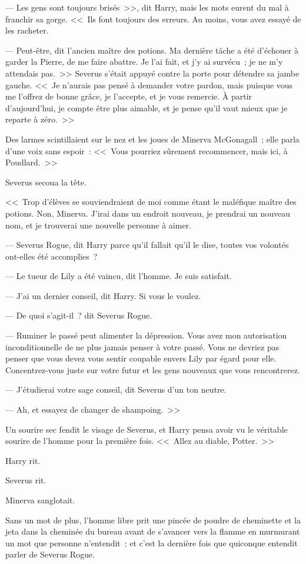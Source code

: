 --- Les gens sont toujours brisés~>>, dit Harry, mais les mots eurent du mal à franchir sa gorge. <<~Ils font toujours des erreurs. Au moins, vous avez essayé de les racheter.

--- Peut-être, dit l'ancien maître des potions. Ma dernière tâche a été d'échouer à garder la Pierre, de me faire abattre. Je l'ai fait, et j'y ai survécu~; je ne m'y attendais pas.~>> Severus s'était appuyé contre la porte pour détendre sa jambe gauche. <<~Je n'aurais pas pensé à demander votre pardon, mais puisque vous me l'offrez de bonne grâce, je l'accepte, et je vous remercie. À partir d'aujourd'hui, je compte être plus aimable, et je pense qu'il vaut mieux que je reparte à zéro.~>>

Des larmes scintillaient sur le nez et les joues de Minerva McGonagall~; elle parla d'une voix sans espoir~: <<~Vous pourriez sûrement recommencer, mais ici, à Poudlard.~>>

Severus secoua la tête.

<<~Trop d'élèves se souviendraient de moi comme étant le maléfique maître des potions. Non, Minerva. J'irai dans un endroit nouveau, je prendrai un nouveau nom, et je trouverai une nouvelle personne à aimer.

--- Severus Rogue, dit Harry parce qu'il fallait qu'il le dise, toutes vos volontés ont-elles été accomplies~?

--- Le tueur de Lily a été vaincu, dit l'homme. Je suis satisfait.

--- J'ai un dernier conseil, dit Harry. Si vous le voulez.

--- De quoi s'agit-il~? dit Severus Rogue.

--- Ruminer le passé peut alimenter la dépression. Vous avez mon autorisation inconditionnelle de ne plus jamais penser à votre passé. Vous ne devriez pas penser que vous devez vous sentir coupable envers Lily par égard pour elle. Concentrez-vous juste sur votre futur et les gens nouveaux que vous rencontrerez.

--- J'étudierai votre sage conseil, dit Severus d'un ton neutre.

--- Ah, et essayez de changer de shampoing.~>>

Un sourire sec fendit le visage de Severus, et Harry pensa avoir vu le véritable sourire de l'homme pour la première fois. <<~Allez au diable, Potter.~>>

Harry rit.

Severus rit.

Minerva sanglotait.

Sans un mot de plus, l'homme libre prit une pincée de poudre de cheminette et la jeta dans la cheminée du bureau avant de s'avancer vers la flamme en murmurant un mot que personne n'entendit~; et c'est la dernière fois que quiconque entendit parler de Severus Rogue.
